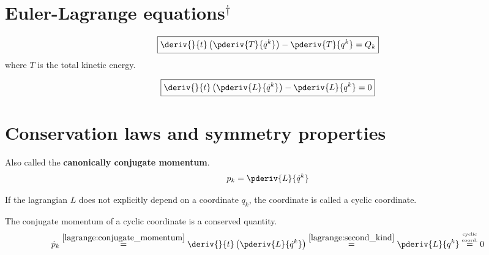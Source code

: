 \section{Euler-Lagrange equations\texorpdfstring{$^\dag$}\ }
	\begin{formula}
    	\begin{gather}
        	\label{lagrange:first_kind}
			\boxed{\deriv{}{t}\left(\pderiv{T}{\dot{q}^k}\right) - \pderiv{T}{q^k} = Q_k}
		\end{gather}
		where $T$ is the total kinetic energy.
    \end{formula}
	\begin{formula}
    	\begin{gather}
        	\label{lagrange:second_kind}
            \boxed{\deriv{}{t}\left(\pderiv{L}{\dot{q}^k}\right) - \pderiv{L}{q^k} = 0}
        \end{gather}
    \end{formula}

\section{Conservation laws and symmetry properties}

	\begin{definition}
		Also called the \textbf{canonically conjugate momentum}.
	    	\begin{gather}
			\label{lagrange:conjugate_momentum}
			p_k = \pderiv{L}{\dot{q}^k}
		\end{gather}
	\end{definition}
	\begin{definition}
	    	If the lagrangian $L$ does not explicitly depend on a coordinate $q_k$, the coordinate is called a cyclic coordinate.
	\end{definition}
    
	\begin{property}
		The conjugate momentum of a cyclic coordinate is a conserved quantity.
		\begin{gather}
			\dot{p}_k \overset{\ref{lagrange:conjugate_momentum}}{=} \deriv{}{t}\left(\pderiv{L}{\dot{q}^k}\right) \overset{{\ref{lagrange:second_kind}}}{=}\pderiv{L}{q^k} \overset{\underset{\text{\tiny{coord.}}}{\text{\tiny{cyclic}}}}{=} 0
		\end{gather}
	\end{property}

